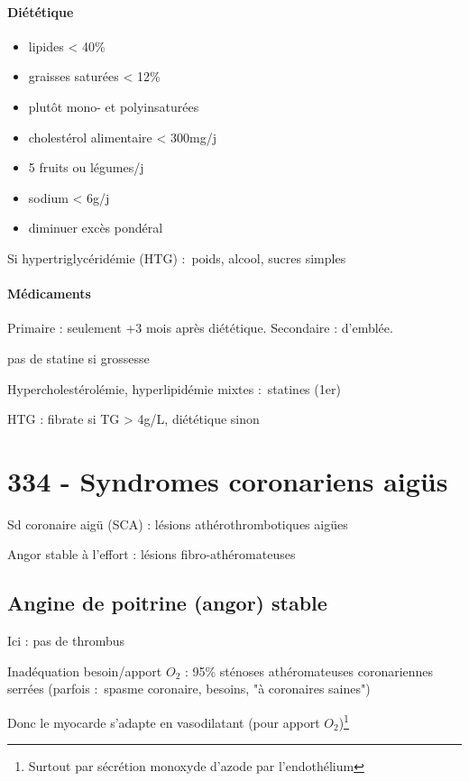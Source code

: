 \paragraph{Diététique}
\begin{itemize}
  \item lipides < 40\%
  \item graisses saturées < 12\%
  \item plutôt mono- et polyinsaturées
  \item cholestérol alimentaire < 300mg/j
  \item 5 fruits ou légumes/j
  \item sodium < 6g/j
  \item diminuer excès pondéral
\end{itemize}
Si hypertriglycéridémie (HTG) : \dec poids, alcool, sucres simples

\paragraph{Médicaments}
Primaire : seulement +3 mois après diététique. Secondaire : d'emblée.

\danger pas de statine si grossesse

Hypercholestérolémie, hyperlipidémie mixtes : statines (1er)

HTG : fibrate si TG > 4g/L, diététique sinon



\section{334 - Syndromes coronariens aigüs}%
\label{sec:334_syndromes_coronariens_aigus}

Sd coronaire aigü (SCA) : lésions athérothrombotiques aigües

Angor stable à l'effort : lésions fibro-athéromateuses

\subsection{Angine de poitrine (angor) stable}
Ici : pas de thrombus

Inadéquation besoin/apport $O_2$ : 95\% sténoses athéromateuses coronariennes
serrées (parfois : spasme coronaire, \inc besoins, "à coronaires saines")

Donc le myocarde s'adapte en vasodilatant (pour apport $O_2$)\footnote{Surtout par
sécrétion monoxyde d'azode par l'endothélium}

